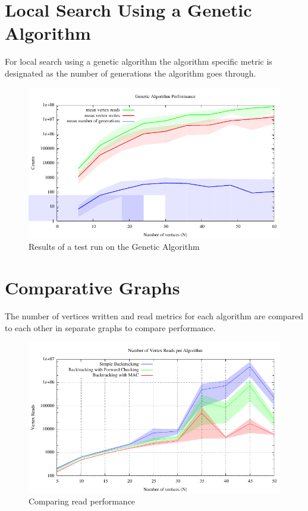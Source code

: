 \documentclass{article}
\begin{document}
\begin{multicols}{2}
\begin{figure}[H]
\end{figure}

\section{Local Search Using a Genetic Algorithm}
For local search using a genetic algorithm the algorithm specific metric is designated as the number of generations the algorithm goes through. 
\begin{figure}[H]
	\centering
	\includegraphics[width=\linewidth]{../results/genetic/genetic_performance}
	\caption{Results of a test run on the Genetic Algorithm}
\end{figure}

\section{Comparative Graphs}
The number of vertices written and read metrics for each algorithm are compared to each other in separate graphs to compare performance.
\begin{figure}[H]
	\centering
	\includegraphics[width=\linewidth]{../results/comparing_read_performance}
	\caption{Comparing read performance}
\end{figure}


\end{multicols}
\end{document}
